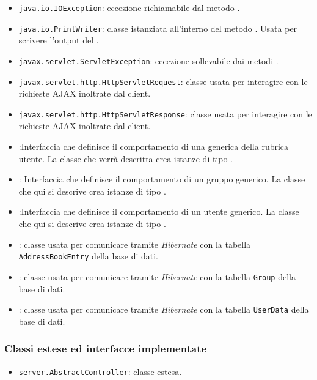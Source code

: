 \begin{itemize}
	\item \texttt{java.io.IOException}: eccezione richiamabile dal metodo .
	\item \texttt{java.io.PrintWriter}: classe istanziata all'interno del metodo . Usata per scrivere l'output del .
	\item \texttt{javax.servlet.ServletException}: eccezione sollevabile dai metodi .
	\item \texttt{javax.servlet.http.HttpServletRequest}: classe usata per interagire con le richieste AJAX inoltrate dal client.
	\item \texttt{javax.servlet.http.HttpServletResponse}: classe usata per interagire con le richieste AJAX inoltrate dal client.
	\item {}:Interfaccia che definisce il comportamento di una generica  della rubrica utente. La classe che verrà descritta crea istanze di tipo .
	\item {}:
Interfaccia che definisce il comportamento di un gruppo generico. La classe che qui si descrive crea istanze di tipo .
	\item {}:Interfaccia che definisce il comportamento di un utente generico. La classe che qui si descrive crea istanze di tipo .
	\item {}: classe usata per comunicare tramite \textit{Hibernate} con la tabella \texttt{AddressBookEntry} della base di dati.
	\item {}: classe usata per comunicare tramite \textit{Hibernate} con la tabella \texttt{Group} della base di dati.
	\item {}: classe usata per comunicare tramite \textit{Hibernate} con la tabella \texttt{UserData} della base di dati.
\end{itemize}

\subsubsection*{Classi estese ed interfacce implementate}
\begin{itemize}
	\item \texttt{server.AbstractController}: classe estesa.
\end{itemize}

